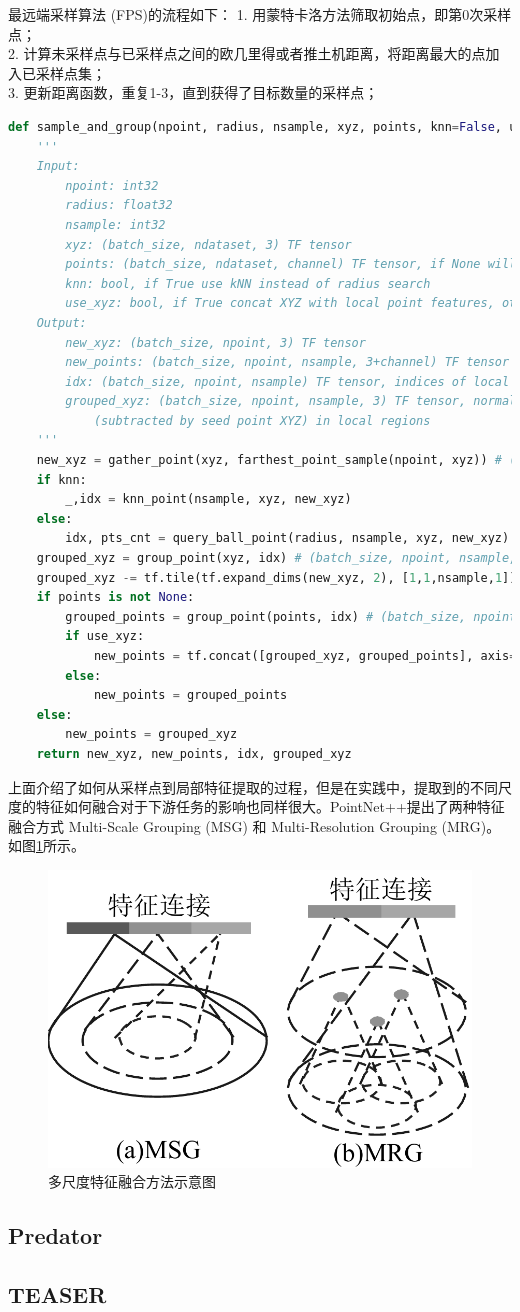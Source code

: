 最远端采样算法 (FPS)的流程如下：
1. 用蒙特卡洛方法筛取初始点，即第0次采样点； \\
2. 计算未采样点与已采样点之间的欧几里得或者推土机距离，将距离最大的点加入已采样点集； \\
3. 更新距离函数，重复1-3，直到获得了目标数量的采样点； \\

\begin{lstlisting}[language=Python, caption={Sampling}, label={lst:pythonfile}]
    def sample_and_group(npoint, radius, nsample, xyz, points, knn=False, use_xyz=True):
    '''
    Input:
        npoint: int32
        radius: float32
        nsample: int32
        xyz: (batch_size, ndataset, 3) TF tensor
        points: (batch_size, ndataset, channel) TF tensor, if None will just use xyz as points
        knn: bool, if True use kNN instead of radius search
        use_xyz: bool, if True concat XYZ with local point features, otherwise just use point features
    Output:
        new_xyz: (batch_size, npoint, 3) TF tensor
        new_points: (batch_size, npoint, nsample, 3+channel) TF tensor
        idx: (batch_size, npoint, nsample) TF tensor, indices of local points as in ndataset points
        grouped_xyz: (batch_size, npoint, nsample, 3) TF tensor, normalized point XYZs
            (subtracted by seed point XYZ) in local regions
    '''
    new_xyz = gather_point(xyz, farthest_point_sample(npoint, xyz)) # (batch_size, npoint, 3)
    if knn:
        _,idx = knn_point(nsample, xyz, new_xyz)
    else:
        idx, pts_cnt = query_ball_point(radius, nsample, xyz, new_xyz)
    grouped_xyz = group_point(xyz, idx) # (batch_size, npoint, nsample, 3)
    grouped_xyz -= tf.tile(tf.expand_dims(new_xyz, 2), [1,1,nsample,1]) # translation normalization
    if points is not None:
        grouped_points = group_point(points, idx) # (batch_size, npoint, nsample, channel)
        if use_xyz:
            new_points = tf.concat([grouped_xyz, grouped_points], axis=-1) # (batch_size, npoint, nample, 3+channel)
        else:
            new_points = grouped_points
    else:
        new_points = grouped_xyz
    return new_xyz, new_points, idx, grouped_xyz
\end{lstlisting}

上面介绍了如何从采样点到局部特征提取的过程，但是在实践中，提取到的不同尺度的特征如何融合对于下游任务的影响也同样很大。PointNet++提出了两种特征融合方式 Multi-Scale Grouping (MSG) 和 Multi-Resolution Grouping (MRG)。如图\ref{fig:pnpp_grouping}所示。

\begin{figure}[H]
    \centering
    \includegraphics[width=0.3\linewidth]{images/pnpp_group.pdf}
    \caption{多尺度特征融合方法示意图}
    \label{fig:pnpp_grouping}
    \vspace{-5mm}
\end{figure}


\subsection{Predator}
\subsection{TEASER}